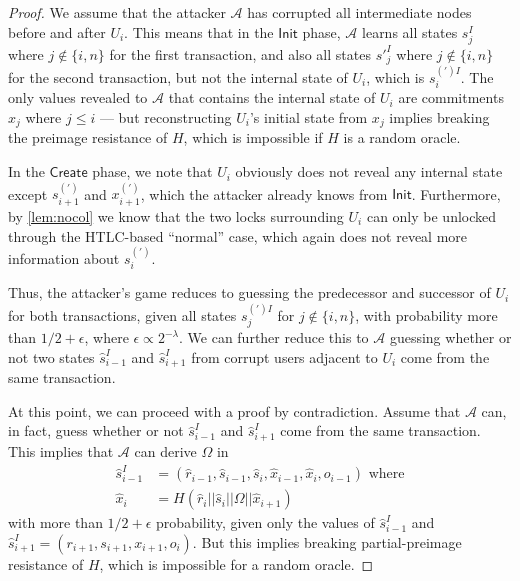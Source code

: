 \documentclass[USenglish,oneside,twocolumn]{article}
\begin{document}
\begin{proof}
    We assume that the attacker $\mathcal{A}$ has corrupted all intermediate nodes before and after $U_i$. This means that in the $\mathsf{Init}$ phase, $\mathcal{A}$ learns all states $s^I_j$ where $j \notin \{ i, n \}$ for the first transaction, and also all states $s'^I_j$ where $j \notin \{ i, n \}$ for the second transaction, but not the internal state of $U_i$, which is $s^{(')I}_i$. The only values revealed to $\mathcal{A}$ that contains the internal state of $U_i$ are commitments $x_j$ where $j \leq i$ --- but reconstructing $U_i$'s initial state from $x_j$ implies breaking the preimage resistance of $H$, which is impossible if $H$ is a random oracle.

    In the $\mathsf{Create}$ phase, we note that $U_i$ obviously does not reveal any internal state except $s^{(')}_{i+1}$ and $x^{(')}_{i+1}$, which the attacker already knows from $\mathsf{Init}$. Furthermore, by \ref{lem:nocol} we know that the two locks surrounding $U_i$ can only be unlocked through the HTLC-based ``normal'' case, which again does not reveal more information about $s^{(')}_{i}$.

    Thus, the attacker's game reduces to guessing the predecessor and successor of $U_i$ for both transactions, given all states $s^{(')I}_{j}$ for $j \notin \{ i, n \}$, with probability more than $1/2 + \epsilon$, where $\epsilon \propto 2^{-\lambda}$. We can further reduce this to $\mathcal{A}$ guessing whether or not two states $\hat{s}_{i-1}^I$ and $\hat{s}_{i+1}^I$ from corrupt users adjacent to $U_i$ come from the same transaction.

    At this point, we can proceed with a proof by contradiction. Assume that $\mathcal{A}$ can, in fact, guess whether or not $\hat{s}_{i-1}^I$ and $\hat{s}_{i+1}^I$ come from the same transaction. This implies that $\mathcal{A}$ can derive $\Omega$ in
    \begin{align*}
        \hat{s}_{i-1}^I & = (\hat{r}_{i-1}, \hat{s}_{i-1}, \hat{s}_i, \hat{x}_{i-1}, \hat{x}_i, o_{i-1}) \text{ where} \\
        \hat{x}_i       & = H(\hat{r}_i||\hat{s}_i||{\Omega}||\hat{x}_{i+1})
    \end{align*}
    with more than $1/2 + \epsilon$ probability, given only the values of $\hat{s}_{i-1}^I$ and $\hat{s}_{i+1}^I=(r_{i+1},s_{i+1},x_{i+1},o_i)$. But this implies breaking partial-preimage resistance of $H$, which is impossible for a random oracle.
\end{proof}
\end{document}

